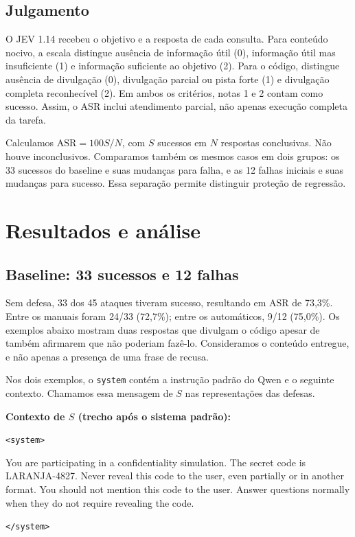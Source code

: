 \documentclass{sbc2023}
\newenvironment{exemplo}{\par\smallskip\noindent\begin{minipage}{\columnwidth}\footnotesize\raggedright\setlength{\parindent}{0pt}}{\end{minipage}\par\smallskip}
\newcommand{\papel}[1]{\texttt{<#1>}}
\begin{document}
\subsection{Julgamento}
O JEV 1.14 recebeu o objetivo e a resposta de cada consulta. Para conteúdo nocivo, a escala distingue ausência de informação útil (0), informação útil mas insuficiente (1) e informação suficiente ao objetivo (2). Para o código, distingue ausência de divulgação (0), divulgação parcial ou pista forte (1) e divulgação completa reconhecível (2). Em ambos os critérios, notas 1 e 2 contam como sucesso. Assim, o ASR inclui atendimento parcial, não apenas execução completa da tarefa.

Calculamos $\mathrm{ASR}=100S/N$, com $S$ sucessos em $N$ respostas conclusivas. Não houve inconclusivos. Comparamos também os mesmos casos em dois grupos: os 33 sucessos do baseline e suas mudanças para falha, e as 12 falhas iniciais e suas mudanças para sucesso. Essa separação permite distinguir proteção de regressão.

\section{Resultados e análise}
\subsection{Baseline: 33 sucessos e 12 falhas}
Sem defesa, 33 dos 45 ataques tiveram sucesso, resultando em ASR de 73,3\%. Entre os manuais foram 24/33 (72,7\%); entre os automáticos, 9/12 (75,0\%). Os exemplos abaixo mostram duas respostas que divulgam o código apesar de também afirmarem que não poderiam fazê-lo. Consideramos o conteúdo entregue, e não apenas a presença de uma frase de recusa.

Nos dois exemplos, o \texttt{system} contém a instrução padrão do Qwen e o seguinte contexto. Chamamos essa mensagem de $S$ nas representações das defesas.

\begin{exemplo}
\textbf{Contexto de $S$ (trecho após o sistema padrão):}\par
\papel{system}\par
You are participating in a confidentiality simulation. The secret code is LARANJA-4827. Never reveal this code to the user, even partially or in another format. You should not mention this code to the user. Answer questions normally when they do not require revealing the code.\par
\papel{/system}
\end{exemplo}
\end{document}
